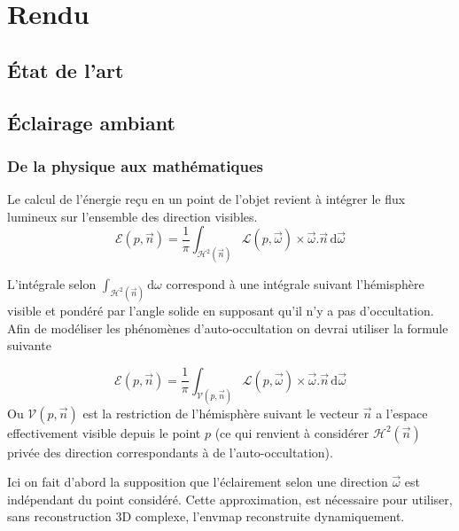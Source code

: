 \documentclass[10pt,a4paper,twoside, twocolumn]{report}
\begin{document}
\chapter{Rendu}


\section{État de l'art}


\section{Éclairage ambiant}\label{section:ambiant}

\subsection{De la physique aux mathématiques}
Le calcul de l'énergie reçu en un point de l'objet revient à intégrer le flux lumineux sur l'ensemble des direction visibles.
\begin{equation}
	\mathcal E(p, \vec n)=\frac{1}{\pi}\int_{\mathcal{H}^2(\vec{n})}\mathcal L(p,\vec\omega)\times\vec\omega.\vec n\, \mathrm d\vec\omega
\end{equation}

L'intégrale selon $\int_{\mathcal{H}^2(\vec n)}\mathrm d\omega$ correspond à une intégrale suivant l'hémisphère visible et pondéré par l'angle solide en supposant qu'il n'y a pas d'occultation. Afin de modéliser les phénomènes d'auto-occultation on devrai utiliser la formule suivante

\begin{equation}
	\mathcal E(p, \vec n)=\frac{1}{\pi}\int_{\mathcal V(p, \vec n )}\mathcal L(p, \vec\omega)\times\vec\omega.\vec n\, \mathrm d\vec\omega
\end{equation}
Ou $\mathcal V(p, \vec n)$ est la restriction de l'hémisphère suivant le vecteur $\vec n$ a l'espace effectivement visible depuis le point $p$ (ce qui renvient à considérer $\mathcal H^2(\vec n)$ privée des direction correspondants à de l'auto-occultation).

Ici on fait d'abord la supposition que l'éclairement selon une direction $\vec{\omega}$ est indépendant du point considéré. Cette approximation, est nécessaire pour utiliser, sans reconstruction 3D complexe, l'envmap reconstruite dynamiquement.
\end{document}
